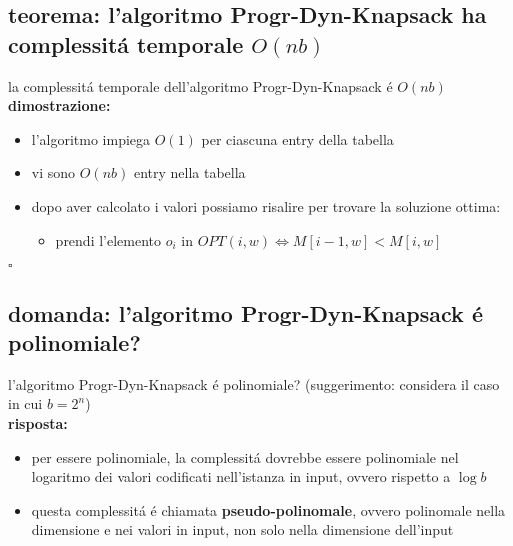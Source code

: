 
\subsection*{teorema: l'algoritmo Progr-Dyn-Knapsack ha complessit\'a temporale $O(nb)$}
\begin{flushleft}
	la complessit\'a temporale dell'algoritmo Progr-Dyn-Knapsack \'e $O(nb)$ \newline \\
	\textbf{dimostrazione:}
	\begin{itemize}
		\item l'algoritmo impiega $O(1)$ per ciascuna entry della tabella
		\item vi sono $O(nb)$ entry nella tabella
		\item dopo aver calcolato i valori possiamo risalire per trovare la soluzione ottima:
		\begin{itemize}
			\item prendi l'elemento $o_i$ in $OPT(i,w)\iff M[i-1,w]<M[i,w]$
		\end{itemize}
	\end{itemize}
	\hfill$\square$
\end{flushleft}


\subsection*{domanda: l'algoritmo Progr-Dyn-Knapsack \'e polinomiale?}
\begin{flushleft}
	l'algoritmo Progr-Dyn-Knapsack \'e polinomiale? \newline
	(suggerimento: considera il caso in cui $b=2^n$) \newline \\
	\textbf{risposta:}
	\begin{itemize}
		\item per essere polinomiale, la complessit\'a dovrebbe essere polinomiale nel logaritmo dei valori codificati nell'istanza in input, ovvero rispetto a $\log b$
		\item questa complessit\'a \'e chiamata \textbf{pseudo-polinomale}, ovvero polinomale nella dimensione e nei valori in input, non solo nella dimensione dell'input
	\end{itemize}
\end{flushleft}

